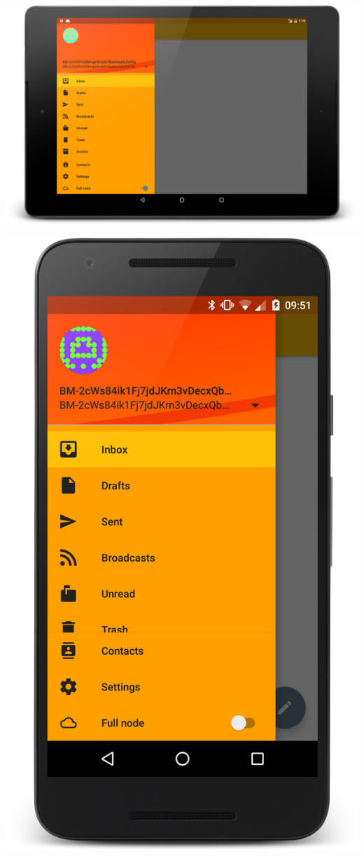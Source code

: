 \documentclass{bfh}
\begin{document}
  \begin{center}
    \begin{minipage}{.69\linewidth}
      \includegraphics[width=1.0 \textwidth]{images/screenshots/drawer_menu_N9_framed.png}
    \end{minipage}
    \hspace{.05\linewidth}
    \begin{minipage}{.24\linewidth}
      \includegraphics[width=1.0 \textwidth]{images/screenshots/drawer_menu.png}

\end{minipage}
\end{center}
\end{document}
